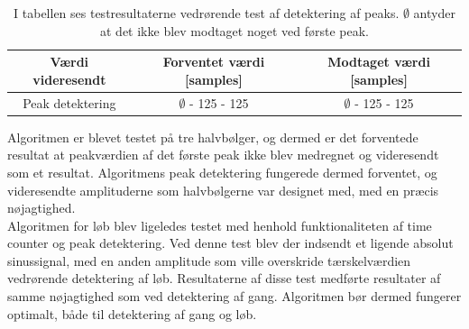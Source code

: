 \begin{table}[H]
	\centering
	\begin{tabular}{ccc}
		\hline
		\rowcolor[HTML]{C0C0C0} 
		Værdi videresendt & Forventet værdi [samples] & Modtaget værdi [samples] \\ \hline
		Peak detektering & $\emptyset$ - 125 - 125 & $\emptyset$ - 125 - 125 \\ \hline
	\end{tabular}
	\caption{I tabellen ses testresultaterne vedrørende test af detektering af peaks. $\emptyset$ antyder at det ikke blev modtaget noget ved første peak.}
	\label{tab:test_res_peak}
\end{table}\vspace{-0.5cm}
Algoritmen er blevet testet på tre halvbølger, og dermed er det forventede resultat at peakværdien af det første peak ikke blev medregnet og videresendt som et resultat. Algoritmens peak detektering
fungerede dermed forventet, og videresendte amplituderne som halvbølgerne var designet med, med en præcis nøjagtighed. \\
Algoritmen for løb blev ligeledes testet med henhold funktionaliteten af time counter og peak detektering. Ved denne test blev der indsendt et ligende absolut sinussignal, med en anden amplitude som ville overskride tærskelværdien vedrørende detektering af løb. Resultaterne af disse test medførte resultater af samme nøjagtighed som ved detektering af gang. Algoritmen bør dermed fungerer optimalt, både til detektering af gang og løb. 


